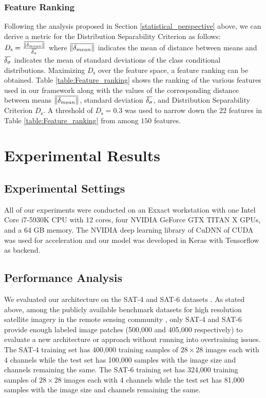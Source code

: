\documentclass[]{interact}
\newcommand{\overbar}[1]{\mkern 1.5mu\overline{\mkern-1.5mu#1\mkern-1.5mu}\mkern 1.5mu}
\theoremstyle{plain}\newtheorem{theorem}{Theorem}[section]
\theoremstyle{definition}
\theoremstyle{remark}
\begin{document}
\subsubsection{Feature Ranking}\label{Section:feature_ranking}
Following the analysis proposed in Section \ref{statistical_perspective} above, we can derive a metric for the Distribution Separability Criterion as follows:
$D_{\mathrm s} = \frac{\overbar{\lVert \delta_{mean} \rVert }}{\overbar{\delta_{\sigma}}}$
where $\overbar{\lVert \delta_{mean} \rVert }$ indicates the mean of distance between means and $\overbar{\delta_{\sigma}}$ indicates the mean of standard deviations of the class conditional distributions. Maximizing $D_{\mathrm s}$ over the feature space, a feature ranking can be obtained. Table \ref{table:Feature_ranking} shows the ranking of the various features used in our framework along with the values of the corresponding distance between means $\overbar{\lVert \delta_{mean} \rVert }$, standard deviation  $\overbar{\delta_{\sigma}}$, and Distribution Separability Criterion $D_{\mathrm s}$. A threshold of $D_{\mathrm s}=0.3$ was used to narrow down the $22$ features in Table \ref{table:Feature_ranking} from among $150$ features. 

\section{Experimental Results}
\subsection{Experimental Settings}

All of our experiments were conducted on  an Exxact workstation with one Intel Core i7-5930K CPU with 12 cores, four NVIDIA GeForce GTX TITAN X GPUs, and a 64 GB memory. The NVIDIA deep learning library of CuDNN of CUDA was used  for acceleration and our model was developed in Keras with  Tensorflow as backend.


\subsection{Performance Analysis}
We evaluated our architecture on the SAT-4 and SAT-6 datasets \citep{basu2015}. As stated above, among the publicly available benchmark datasets for high resolution satellite imagery in the remote sensing community \citep{ml}, only SAT-4 and SAT-6 provide enough labeled image patches (500,000 and 405,000 respectively) to evaluate a new architecture or approach without running into overtraining issues. The SAT-4 training set has 400,000 training samples of $28\times 28$ images each with $4$ channels \citep{basu2015} while the test set has 100,000 samples with the image size and channels remaining the same. The SAT-6 training set has 324,000 training samples of $28\times 28$ images each with $4$ channels \citep{basu2015} while the test set has 81,000 samples with the image size and channels remaining the same. 
\end{document}
